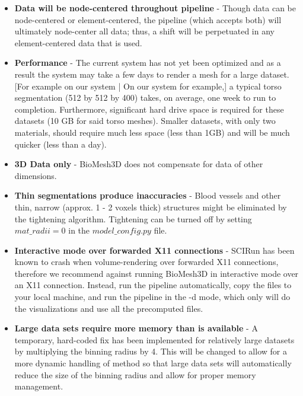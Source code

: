 \documentclass[fleqn,12pt,openany]{book}
\begin{document}
\begin{itemize} 
  \item{\bf Data will be node-centered throughout pipeline} - Though data 
  can be node-centered or element-centered, the pipeline (which accepts both) 
  will ultimately node-center all data; thus, a shift will be perpetuated in 
  any element-centered data that is used.
  
  
  \item{\bf Performance } - The current system has not yet been optimized and as
  a result the system may take a few days to render a mesh for a large dataset.
  [For example on our system | On our system for example,] a typical torso segmentation (512 by 512 by 400) takes,
  on average, one week to run to completion. Furthermore, significant hard drive
  space is required for these datasets (10 GB for said torso meshes).  
  Smaller datasets, with only two materials, should require much 
  less space (less than 1GB) and will be much quicker (less than a day).

 \item{\bf 3D Data only} - BioMesh3D does not compensate for data of other 
 dimensions.
 
 \item{\bf Thin segmentations produce inaccuracies} - Blood vessels and other thin,
   narrow (approx. 1 - 2 voxels thick) structures might be eliminated by the tightening algorithm.
   Tightening can be turned off by setting $mat\_radii = 0$ in the $model\_config.py$ file.
 
  \item{\bf Interactive mode over forwarded X11 connections} - SCIRun has been 
  known to crash when volume-rendering over forwarded X11 connections, therefore
  we recommend against running BioMesh3D in interactive mode over an X11 connection.
  Instead, run the pipeline automatically, copy the files to your local machine,
  and run the pipeline in the -d mode, which only will do the visualizations and
  use all the precomputed files.
  
  \item{\bf Large data sets require more memory than is available} - A temporary, hard-coded 
  fix has been implemented for relatively large datasets by multiplying the binning radius by 4.  
  This will be changed to allow for a more dynamic handling of method so that large data sets
  will automatically reduce the size of the binning radius and allow for proper memory 
  management.

\end{itemize} 
\end{document}
